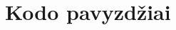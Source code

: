 \appendix
{}
\def\thesection{\arabic{section} priedas.}
\section[\hspace{1.5em} Kodo pavyzdžiai]{Kodo pavyzdžiai}

